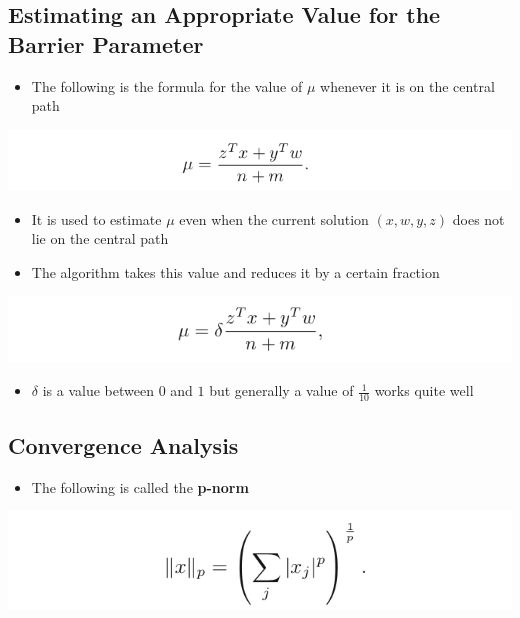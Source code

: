 \documentclass[11pt]{article}
\begin{document}
\subsection{Estimating an Appropriate Value for the Barrier Parameter}
\label{sec:org82f30b7}
\begin{itemize}
\item The following is the formula for the value of \(\mu\) whenever it is on the central path
\end{itemize}
\begin{center}
\includegraphics[width=.9\linewidth]{A Path-Following Method/screenshot_2019-03-11_16-40-49.png}
\end{center}
\begin{itemize}
\item It is used to estimate \(\mu\) even when the current solution \((x,w,y,z)\) does not lie on the central path
\item The algorithm takes this value and reduces it by a certain fraction
\end{itemize}
\begin{center}
\includegraphics[width=.9\linewidth]{A Path-Following Method/screenshot_2019-03-11_16-42-38.png}
\end{center}
\begin{itemize}
\item \(\delta\) is a value between \(0\) and \(1\) but generally a value of \(\frac{1}{10}\) works quite well
\end{itemize}

\subsection{Convergence Analysis}
\label{sec:org8733871}
\begin{itemize}
\item The following is called the \textbf{p-norm}
\end{itemize}
\begin{center}
\includegraphics[width=.9\linewidth]{A Path-Following Method/screenshot_2019-03-11_17-13-01.png}
\end{center} 
\end{document}
